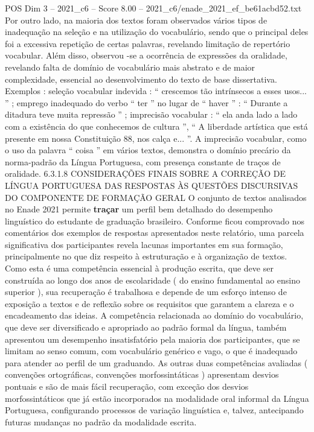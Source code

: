 \begin{textsample}{POS Dim 3 – 2021\_c6 – Score 8.00 – 2021\_c6/enade\_2021\_ef\_be61acbd52.txt}
Por outro lado, na maioria dos textos foram observados vários tipos de inadequação na seleção e na utilização do vocabulário, sendo que o principal deles foi a excessiva repetição de certas palavras, revelando limitação de repertório vocabular.
Além disso, observou -se a ocorrência de expressões da oralidade, revelando falta de domínio de vocabulário mais abstrato e de maior complexidade, essencial ao desenvolvimento do texto de base dissertativa.
Exemplos : seleção vocabular indevida : “ crescemos tão intrínsecos a esses usos... ” ; emprego inadequado do verbo “ ter ” no lugar de “ haver ” : “ Durante a ditadura teve muita repressão ” ; imprecisão vocabular : “ ela anda lado a lado com a existência do que conhecemos de cultura ”, “ A liberdade artística que está presente em nossa Constituição 88, nos calça e... ”.
A imprecisão vocabular, como o uso da palavra “ coisa ” em vários textos, demonstra o domínio precário da norma-padrão da Língua Portuguesa, com presença constante de traços de oralidade. 6.3.1.8 CONSIDERAÇÕES FINAIS SOBRE A CORREÇÃO DE LÍNGUA PORTUGUESA DAS RESPOSTAS ÀS QUESTÕES DISCURSIVAS DO COMPONENTE DE FORMAÇÃO GERAL O conjunto de textos analisados no Enade 2021 permite \textbf{traçar} um perfil bem detalhado do desempenho linguístico do estudante de graduação brasileiro.
Conforme ficou comprovado nos comentários dos exemplos de respostas apresentados neste relatório, uma parcela significativa dos participantes revela lacunas importantes em sua formação, principalmente no que diz respeito à estruturação e à organização de textos.
Como esta é uma competência essencial à produção escrita, que deve ser construída ao longo dos anos de escolaridade ( do ensino fundamental ao ensino superior ), sua recuperação é trabalhosa e depende de um esforço intenso de exposição a textos e de reflexão sobre os requisitos que garantem a clareza e o encadeamento das ideias.
A competência relacionada ao domínio do vocabulário, que deve ser diversificado e apropriado ao padrão formal da língua, também apresentou um desempenho insatisfatório pela maioria dos participantes, que se limitam ao senso comum, com vocabulário genérico e vago, o que é inadequado para atender ao perfil de um graduando.
As outras duas competências avaliadas ( convenções ortográficas, convenções morfossintáticas ) apresentam desvios pontuais e são de mais fácil recuperação, com exceção dos desvios morfossintáticos que já estão incorporados na modalidade oral informal da Língua Portuguesa, configurando processos de variação linguística e, talvez, antecipando futuras mudanças no padrão da modalidade escrita.

\end{textsample}
